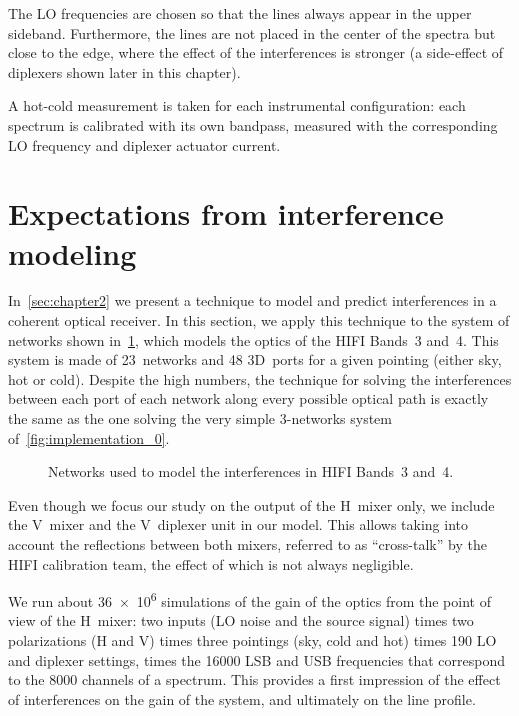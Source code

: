 The LO frequencies are chosen so that the lines always appear in the upper sideband.
Furthermore, the lines are not placed in the center of the spectra but close to the edge, where the effect of the interferences is stronger (a side-effect of diplexers shown later in this chapter).

A hot-cold measurement is taken for each instrumental configuration: each spectrum is calibrated with its own bandpass, measured with the corresponding LO frequency and diplexer actuator current.




\FloatBarrier
\section{Expectations from interference modeling}
\label{sec:s141_interf}
In~\cref{sec:chapter2} we present a technique to model and predict interferences in a coherent optical receiver.
In this section, we apply this technique to the system of networks shown in~\cref{fig:band45_networks}, which models the optics of the HIFI Bands~3 and~4.
This system is made of 23~networks and 48 3D~ports for a given pointing (either sky, hot or cold).
Despite the high numbers, the technique for solving the interferences between each port of each network along every possible optical path is exactly the same as the one solving the very simple 3-networks system of~\vref{fig:implementation_0}.

\begin{figure}[b]
    \centering
    
    \caption{Networks used to model the interferences in HIFI Bands~3 and~4.}
    \label{fig:band45_networks}
\end{figure}

Even though we focus our study on the output of the H~mixer only, we include the V~mixer and the V~diplexer unit in our model.
This allows taking into account the reflections between both mixers, referred to as ``cross-talk'' by the HIFI calibration team, the effect of which is not always negligible.

We run about \num{36e6} simulations of the gain of the optics from the point of view of the H~mixer: two inputs (LO noise and the source signal) times two polarizations (H and V) times three pointings (sky, cold and hot) times 190 LO and diplexer settings, times the \num{16000} LSB and USB frequencies that correspond to the 8000 channels of a spectrum.
This provides a first impression of the effect of interferences on the gain of the system, and ultimately on the line profile.

